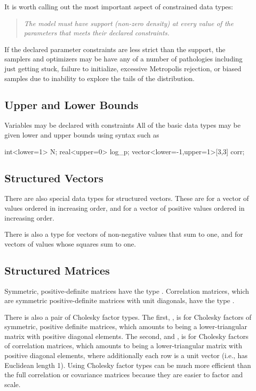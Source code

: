 It is worth calling out the most important aspect of constrained data
types: 
%
\begin{quote}
\it
The model must have support (non-zero density) at every value of the
parameters that meets their declared constraints.
\end{quote}
%
If the declared parameter constraints are less strict than the
support, the samplers and optimizers may be have any of a number of
pathologies including just getting stuck, failure to initialize,
excessive Metropolis rejection, or biased samples due to inability to
explore the tails of the distribution.

\subsection{Upper and Lower Bounds}

Variables may be declared with constraints
All of the basic data types may be given lower and upper bounds using
syntax such as
%
\begin{stancode}
int<lower=1> N;
real<upper=0> log_p;
vector<lower=-1,upper=1>[3,3] corr;
\end{stancode}

\subsection{Structured Vectors}

There are also special data types for structured vectors.  These are
 for a vector of values ordered in increasing order, and
 for a vector of positive values ordered in
increasing order.  

There is also a type  for vectors of non-negative values
that sum to one, and  for vectors of values whose
squares sum to one.

\subsection{Structured Matrices}

Symmetric, positive-definite matrices have the type
.  Correlation matrices, which are symmetric
positive-definite matrices with unit diagonals, have the type
.

There is also a pair of Cholesky factor types.  The first,
, is for Cholesky factors of symmetric,
positive definite matrices, which amounts to being a lower-triangular
matrix with positive diagonal elements.  The second, and
, is for Cholesky factors of correlation
matrices, which amounts to being a lower-triangular matrix with
positive diagonal elements, where additionally each row is a unit
vector (i.e., has Euclidean length 1).  Using Cholesky factor types
can be much more efficient than the full correlation or covariance
matrices because they are easier to factor and scale.



